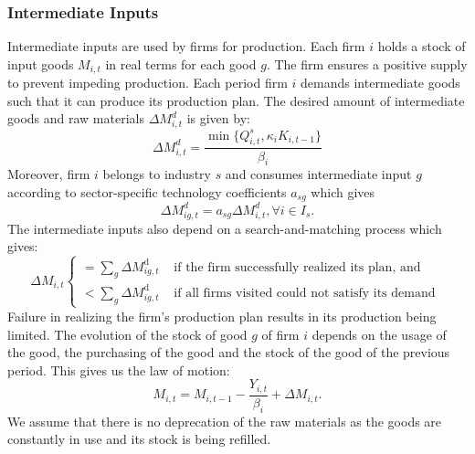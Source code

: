 \subsubsection{Intermediate Inputs}
Intermediate inputs are used by firms for production. Each firm $i$ holds a stock of input goods $M_{i,t}$ in real terms for each good $g$. The firm ensures a positive supply to prevent impeding production. Each period firm $i$ demands intermediate goods such that it can produce its production plan. The desired amount of intermediate goods and raw materials $\Delta M^d_{i,t}$ is given by:
\begin{equation}
    \Delta M^d_{i,t} = \frac{\min \{ Q_{i,t}^s,\kappa_i K_{i,t-1}\}}{\beta_i}
\end{equation}
Moreover, firm $i$ belongs to industry $s$ and consumes intermediate input $g$ according to sector-specific technology coefficients $a_{sg}$ which gives
\begin{equation}
    \Delta M^d_{ig,t} = a_{sg} \Delta M^d_{i,t}, \forall i \in I_s.
\end{equation}
The intermediate inputs also depend on a search-and-matching process which gives:
\begin{equation}
\Delta M_{i,t} \begin{cases}=\sum_g \Delta M_{i g,t}^{\mathrm{d}} & \text { if the firm successfully realized its plan, and } \\ <\sum_g \Delta M_{i g,t}^{\mathrm{d}} & \text { if all firms visited could not satisfy its demand }\end{cases}
\end{equation}
Failure in realizing the firm's production plan results in its production being limited. The evolution of the stock of good $g$ of firm $i$ depends on the usage of the good, the purchasing of the good and the stock of the good of the previous period. This gives us the law of motion:
\begin{equation}
    M_{i,t} =M_{i,t-1} - \frac{Y_{i,t}}{\beta_i} +\Delta M_{i,t}.
\end{equation}
We assume that there is no deprecation of the raw materials as the goods are constantly in use and its stock is being refilled.
